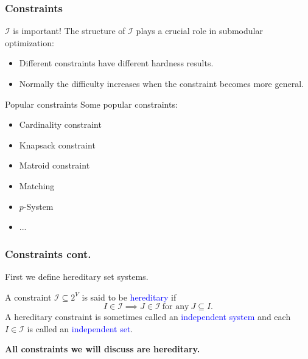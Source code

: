 \documentclass{beamer}
\newcommand{\calI}{\mathcal{I}}
\newcommand{\emRed}[1][]{\textcolor{blue} #1}
\begin{document}
\begin{frame}
\frametitle{Constraints}

\begin{block}{$\calI$ is important!}
The structure of $\calI$ plays a crucial role in submodular optimization:
\begin{itemize}
\item Different constraints have different hardness results.
\item Normally the difficulty increases when the constraint becomes more general.
\end{itemize}
\end{block}
\pause
\begin{block}{Popular constraints}
Some popular constraints:
\begin{itemize}
\item Cardinality constraint
\item Knapsack constraint
\item Matroid constraint
\item Matching
\item $p$-System
\item ...
\end{itemize}
\end{block}
\end{frame}



\begin{frame}
\frametitle{Constraints cont.}
First we define hereditary set systems.
\begin{definition}[Hereditary]
  \label{def:hereditary}
  A constraint $\calI \subseteq 2^V$ is said to be \emRed{hereditary} if 
$$I\in\calI \implies J\in\calI ~\text{for any}~J\subseteq I.$$
A hereditary constraint is sometimes called an \emRed{independent system} and each $I\in\calI$ is called an \emRed{independent set}. 
\end{definition}
\textbf{All constraints we will discuss are hereditary.}
\end{frame}
\end{document}
